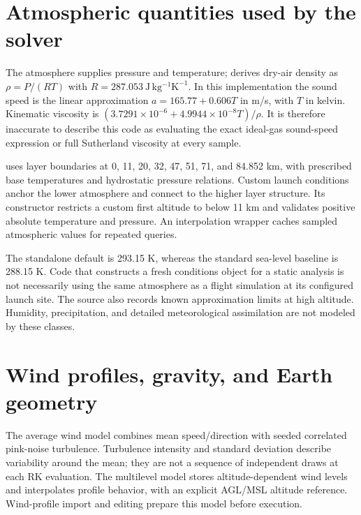 
\section{Atmospheric quantities used by the solver}
The atmosphere supplies pressure and temperature;  derives dry-air density as $\rho=P/(RT)$ with $R=287.053\ \mathrm{J\,kg^{-1}K^{-1}}$. In this implementation the sound speed is the linear approximation $a=165.77+0.606T$ in m/s, with $T$ in kelvin. Kinematic viscosity is $(3.7291\times10^{-6}+4.9944\times10^{-8}T)/\rho$. It is therefore inaccurate to describe this code as evaluating the exact ideal-gas sound-speed expression or full Sutherland viscosity at every sample.

 uses layer boundaries at 0, 11, 20, 32, 47, 51, 71, and 84.852 km, with prescribed base temperatures and hydrostatic pressure relations. Custom launch conditions anchor the lower atmosphere and connect to the higher layer structure. Its constructor restricts a custom first altitude to below 11 km and validates positive absolute temperature and pressure. An interpolation wrapper caches sampled atmospheric values for repeated queries.

The standalone  default is 293.15 K, whereas the standard  sea-level baseline is 288.15 K. Code that constructs a fresh conditions object for a static analysis is not necessarily using the same atmosphere as a flight simulation at its configured launch site. The source also records known approximation limits at high altitude. Humidity, precipitation, and detailed meteorological assimilation are not modeled by these classes.

\section{Wind profiles, gravity, and Earth geometry}
The average wind model combines mean speed/direction with seeded correlated pink-noise turbulence. Turbulence intensity and standard deviation describe variability around the mean; they are not a sequence of independent draws at each RK evaluation. The multilevel model stores altitude-dependent wind levels and interpolates profile behavior, with an explicit AGL/MSL altitude reference. Wind-profile import and editing prepare this model before execution.

